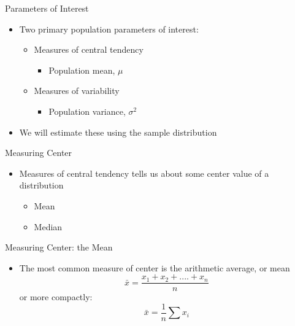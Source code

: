 \documentclass{beamer}
\begin{document}
\begin{frame}{Parameters of Interest}
	
	\begin{itemize}
		\item Two primary population parameters of interest:
		      \begin{itemize}
		      	\item Measures of central tendency
		      	      \begin{itemize}
		      	      	\item Population mean, $\mu$
		      	      \end{itemize}
		      	\item Measures of variability 
		      	      \begin{itemize}
		      	      	\item Population variance, $\sigma^2$
		      	      \end{itemize}
		      \end{itemize}
		\item We will estimate these using the sample distribution
	\end{itemize}
	
\end{frame}

\begin{frame}{Measuring Center}
	
	\begin{itemize}
		\item Measures of central tendency tells us about some center value of a distribution
		      \begin{itemize}
		      	\item Mean
		      	\item Median
		      \end{itemize}
	\end{itemize}
	
\end{frame}

\begin{frame}{Measuring Center: the Mean}
	
	\begin{itemize}
		\item The most common measure of center is the arithmetic average, or \alert{mean}
		      $$\bar{x}= \frac{x_1 + x_2 + .... + x_n}{n}$$
		      or more compactly:
		      $$\bar{x}=\frac{1}{n}\sum x_i$$
	\end{itemize}
	
\end{frame}
\end{document}
